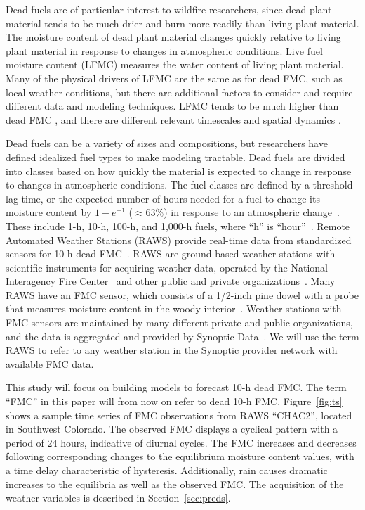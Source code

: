 \documentclass[fire,article,submit,pdftex,moreauthors]{Definitions/mdpi}
\begin{document}
Dead fuels are of particular interest to wildfire researchers, since dead plant material tends to be much drier and burn more readily than living plant material. The moisture content of dead plant material changes quickly relative to living plant material in response to changes in atmospheric conditions. Live fuel moisture content (LFMC) measures the water content of living plant material. Many of the physical drivers of LFMC are the same as for dead FMC, such as local weather conditions, but there are additional factors to consider and require different data and modeling techniques. LFMC tends to be much higher than dead FMC \citep[e.g.,][]{NWCG-2022-LFM}, and there are different relevant timescales and spatial dynamics \citep[e.g.,][]{NWCG-2022-LFM, Lewis-2024-DFM}.

Dead fuels can be a variety of sizes and compositions, but researchers have defined idealized fuel types to make modeling tractable. Dead fuels are divided into classes based on how quickly the material is expected to change in response to changes in atmospheric conditions. The fuel classes are defined by a threshold lag-time, or the expected number of hours needed for a fuel to change its moisture content by $1-e^{-1}$ ($\approx63\%$) in response to an atmospheric change~\citep[e.g., p.\ 216][]{Viney-1991-RFF}. These include 1-h, 10-h, 100-h, and 1,000-h fuels, where ``h'' is ``hour''~\citep{NCEI-2024-DFM}. Remote Automated Weather Stations (RAWS) provide real-time data from standardized sensors for 10-h dead FMC~\citep{NIFC-2024-RAW}. RAWS are ground-based weather stations with scientific instruments for acquiring weather data, operated by the National Interagency Fire Center~\citep{NIFC-2024-RAW} and other public and private organizations~\citep{Synoptic-2025-MSN}. Many RAWS have an FMC sensor, which consists of a \mbox{1/2-inch} pine dowel with a probe that measures moisture content in the woody interior~\citep{Campbell-2015-CFM, FTS-2016-FSS}. Weather stations with FMC sensors are maintained by many different private and public organizations, and the data is aggregated and provided by Synoptic Data~\citep{Synoptic-2025-MSN}. We will use the term RAWS to refer to any weather station in the Synoptic provider network with available FMC data. 

This study will focus on building models to forecast 10-h dead FMC. The term ``FMC'' in this paper will from now on refer to dead 10-h FMC. Figure~\ref{fig:ts} shows a sample time series of FMC observations from RAWS ``CHAC2'', located in Southwest Colorado. The observed FMC displays a cyclical pattern with a period of 24 hours, indicative of diurnal cycles. The FMC increases and decreases following corresponding changes to the equilibrium moisture content values, with a time delay characteristic of hysteresis. Additionally, rain causes dramatic increases to the equilibria as well as the observed FMC. The acquisition of the weather variables is described in Section~\ref{sec:preds}.
\end{document}
